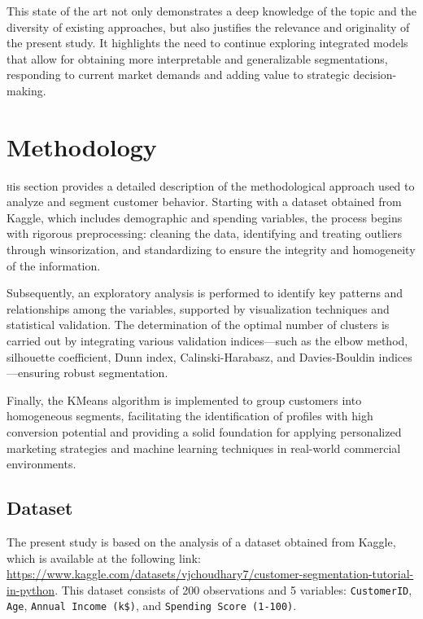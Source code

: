 \documentclass[10pt]{article}
\newcommand*\initfamily{\usefont{U}{GoudyIn}{xl}{n}}
\begin{document}
This state of the art not only demonstrates a deep knowledge of the topic and the diversity of existing approaches, but also justifies the relevance and originality of the present study. It highlights the need to continue exploring integrated models that allow for obtaining more interpretable and generalizable segmentations, responding to current market demands and adding value to strategic decision-making.

\section{Methodology}
\lettrine[lines=3, loversize=0.01, lhang=0.01]{\scalebox{0.9}{\initfamily T}}{h}is section provides a detailed description of the methodological approach used to analyze and segment customer behavior. Starting with a dataset obtained from Kaggle, which includes demographic and spending variables, the process begins with rigorous preprocessing: cleaning the data, identifying and treating outliers through winsorization, and standardizing to ensure the integrity and homogeneity of the information.

Subsequently, an exploratory analysis is performed to identify key patterns and relationships among the variables, supported by visualization techniques and statistical validation. The determination of the optimal number of clusters is carried out by integrating various validation indices---such as the elbow method, silhouette coefficient, Dunn index, Calinski-Harabasz, and Davies-Bouldin indices---ensuring robust segmentation.

Finally, the KMeans algorithm is implemented to group customers into homogeneous segments, facilitating the identification of profiles with high conversion potential and providing a solid foundation for applying personalized marketing strategies and machine learning techniques in real-world commercial environments.

\subsection{Dataset}
\sloppy
The present study is based on the analysis of a dataset obtained from Kaggle, which is available at the following link: \url{https://www.kaggle.com/datasets/vjchoudhary7/customer-segmentation-tutorial-in-python}. This dataset consists of 200 observations and 5 variables: \texttt{CustomerID}, \texttt{Age}, \texttt{Annual Income (k\$)}, and \texttt{Spending Score (1-100)}.
\end{document}
